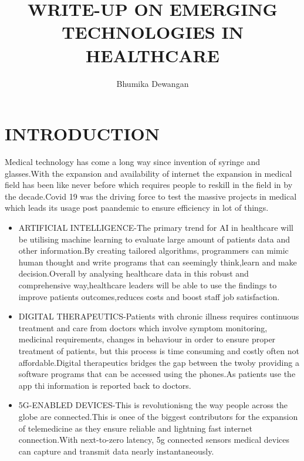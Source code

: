 \documentclass[12 pt]{article}
\title{WRITE-UP ON EMERGING TECHNOLOGIES IN HEALTHCARE}
\author{Bhumika Dewangan}
\date{}
\begin{document}
\maketitle
\section{INTRODUCTION}
Medical technology has come a long way since invention of syringe and glasses.With the expansion and availability of internet the expansion in medical field has been like never before which requires people to reskill in the field in by the decade.Covid 19 was the driving force to test the massive projects in medical which leads its usage post paandemic to ensure efficiency in lot of things.
\begin{itemize}
\item ARTIFICIAL INTELLIGENCE-The primary trend for AI in healthcare will be utilising machine learning to evaluate large amount of patients data and other information.By creating tailored algorithms, programmers can mimic human thought and write programs that can seemingly think,learn and make decision.Overall by analysing healthcare data in this robust and comprehensive way,healthcare leaders will be able to use the findings to improve patients outcomes,reduces costs and boost staff job satisfaction.
\item DIGITAL THERAPEUTICS-Patients with chronic illness requires continuous treatment and care from doctors which involve symptom monitoring, medicinal requirements, changes in behaviour in order to ensure proper treatment of patients, but this process is time consuming and costly often not affordable.Digital therapeutics bridges the gap between the twoby providing a software programs that can be accessed using the phones.As patients use the app thi information is reported back to doctors.
\item 5G-ENABLED DEVICES-This is revolutionisng the way people across the globe are connected.This is onee of the biggest contributors for the expansion of telemedicine as they ensure reliable and lightning fast internet connection.With next-to-zero latency, 5g connected sensors medical devices can capture and transmit data nearly instantaneously.

\end{itemize}
\end{document}

